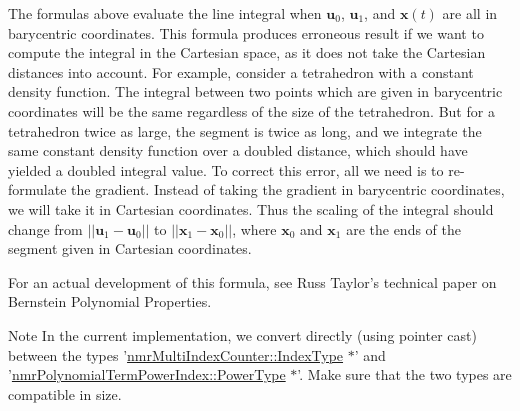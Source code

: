 The formulas above evaluate the line integral when $\mathbf{u}_0$, $\mathbf{u}_1$, and $\mathbf{x}(t)$ are all in barycentric coordinates. This formula produces erroneous result if we want to compute the integral in the Cartesian space, as it does not take the Cartesian distances into account. For example, consider a tetrahedron with a constant density function. The integral between two points which are given in barycentric coordinates will be the same regardless of the size of the tetrahedron. But for a tetrahedron twice as large, the segment is twice as long, and we integrate the same constant density function over a doubled distance, which should have yielded a doubled integral value. To correct this error, all we need is to re-\/formulate the gradient. Instead of taking the gradient in barycentric coordinates, we will take it in Cartesian coordinates. Thus the scaling of the integral should change from $||\mathbf{u}_1 - \mathbf{u}_0 ||$ to $||\mathbf{x}_1 - \mathbf{x}_0 ||$, where $\mathbf{x}_0$ and $\mathbf{x}_1$ are the ends of the segment given in Cartesian coordinates.

For an actual development of this formula, see Russ Taylor's technical paper on Bernstein Polynomial Properties.

\begin{DoxyNote}{Note}
In the current implementation, we convert directly (using pointer cast) between the types '\hyperlink{classnmr_multi_index_counter_a0632b941a7d18df347174b4345d73d01}{nmr\-Multi\-Index\-Counter\-::\-Index\-Type} $\ast$' and '\hyperlink{classnmr_polynomial_term_power_index_a2eec01c3a2c3f56f47982ceffd8e36ed}{nmr\-Polynomial\-Term\-Power\-Index\-::\-Power\-Type} $\ast$'. Make sure that the two types are compatible in size. 
\end{DoxyNote}


